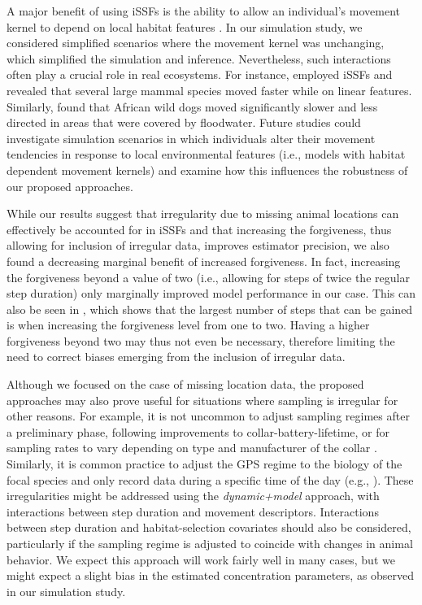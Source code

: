 \documentclass[../FinalThesis.tex]{subfiles}
\begin{document}
A major benefit of using iSSFs is the ability to allow an individual's movement
kernel to depend on local habitat features \citep{Avgar.2016}. In our simulation
study, we considered simplified scenarios where the movement kernel was
unchanging, which simplified the simulation and inference. Nevertheless, such
interactions often play a crucial role in real ecosystems. For instance,
\citet{Dickie.2020} employed iSSFs and revealed that several large mammal
species moved faster while on linear features. Similarly, \citet{Hofmann.2023}
found that African wild dogs moved significantly slower and less directed in
areas that were covered by floodwater. Future studies could investigate
simulation scenarios in which individuals alter their movement tendencies in
response to local environmental features (i.e., models with habitat dependent
movement kernels) and examine how this influences the robustness of our proposed
approaches.

While our results suggest that irregularity due to missing animal locations can
effectively be accounted for in iSSFs and that increasing the forgiveness, thus
allowing for inclusion of irregular data, improves estimator precision, we also
found a decreasing marginal benefit of increased forgiveness. In fact,
increasing the forgiveness beyond a value of two (i.e., allowing for steps of
twice the regular step duration) only marginally improved model performance in
our case. This can also be seen in , which shows that the
largest number of steps that can be gained is when increasing the forgiveness
level from one to two. Having a higher forgiveness beyond two may thus not even
be necessary, therefore limiting the need to correct biases emerging from the
inclusion of irregular data.

Although we focused on the case of missing location data, the proposed
approaches may also prove useful for situations where sampling is irregular for
other reasons. For example, it is not uncommon to adjust sampling regimes after
a preliminary phase, following improvements to collar-battery-lifetime, or for
sampling rates to vary depending on type and manufacturer of the collar
\citep{Brown.2023}. Similarly, it is common practice to adjust the GPS regime to
the biology of the focal species and only record data during a specific time of
the day (e.g., \citealp{Broekhuis.2013, Cozzi.2013, Elliot.2014}). These
irregularities might be addressed using the \textit{dynamic+model} approach,
with interactions between step duration and movement descriptors. Interactions
between step duration and habitat-selection covariates should also be
considered, particularly if the sampling regime is adjusted to coincide with
changes in animal behavior. We expect this approach will work fairly well in
many cases, but we might expect a slight bias in the estimated concentration
parameters, as observed in our simulation study.
\end{document}
